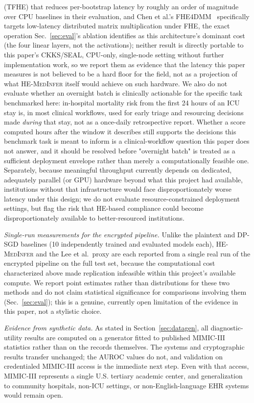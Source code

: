 \documentclass[journal,compsoc]{IEEEtran}
\newcommand{\framework}{\textsc{HE-MedInfer}}
\begin{document}
(TFHE) that reduces per-bootstrap latency by roughly an order of magnitude
over CPU baselines in their evaluation, and Chen et al.'s
FHE4DMM~\cite{chen2025fhe4dmm} specifically targets low-latency distributed
matrix multiplication under FHE, the exact operation Sec.~\ref{sec:eval}'s
ablation identifies as this architecture's dominant cost (the four linear
layers, not the activations); neither result is directly portable to this
paper's CKKS/SEAL, CPU-only, single-node setting without further
implementation work, so we report them as evidence that the latency this
paper measures is not believed to be a hard floor for the field, not as a
projection of what \framework{} itself would achieve on such hardware.
We also do not evaluate whether an overnight batch is clinically actionable
for the specific task benchmarked here: in-hospital mortality risk from the
first 24 hours of an ICU stay is, in most clinical workflows, used for early
triage and resourcing decisions made \emph{during} that stay, not as a
once-daily retrospective report. Whether a score computed hours after the
window it describes still supports the decisions this benchmark task is
meant to inform is a clinical-workflow question this paper does not answer,
and it should be resolved before "overnight batch" is treated as a
sufficient deployment envelope rather than merely a computationally feasible
one. Separately, because meaningful throughput currently depends on
dedicated, adequately parallel (or GPU) hardware beyond what this project
had available, institutions without that infrastructure would face
disproportionately worse latency under this design; we do not evaluate
resource-constrained deployment settings, but flag the risk that HE-based
compliance could become disproportionately available to better-resourced
institutions.

\emph{Single-run measurements for the encrypted pipeline.} Unlike the
plaintext and DP-SGD baselines (10 independently trained and evaluated models
each), \framework{} and the Lee et al.\ proxy are each reported from a single
real run of the encrypted pipeline on the full test set, because the
computational cost characterized above made replication infeasible within
this project's available compute. We report point estimates rather than
distributions for these two methods and do not claim statistical significance
for comparisons involving them (Sec.~\ref{sec:eval}); this is a genuine,
currently open limitation of the evidence in this paper, not a stylistic
choice.

\emph{Evidence from synthetic data.} As stated in Section~\ref{sec:datagen},
all diagnostic-utility results are computed on a generator fitted to published
MIMIC-III statistics rather than on the records themselves. The systems and
cryptographic results transfer unchanged; the AUROC values do not, and
validation on credentialed MIMIC-III access is the immediate next step. Even
with that access, MIMIC-III represents a single U.S. tertiary academic center,
and generalization to community hospitals, non-ICU settings, or
non-English-language EHR systems would remain open.
\end{document}
